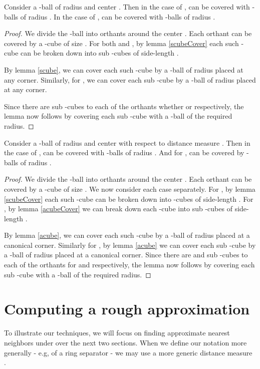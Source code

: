 \documentclass[11pt]{myclass}
\begin{document}
\begin{lemma}\label{sballcover}
Consider a -ball  of radius  and center .
Then in the case of ,  can be covered with  -balls of radius . In the case of ,  can be covered with 
 -balls of radius . 
\end{lemma}
\begin{proof}
We divide the -ball into  orthants around the center . Each orthant can be covered by a -cube of size . 
For both  and , by lemma \ref{scubeCover} each such -cube can be broken down 
into  sub -cubes of side-length .

By lemma \ref{scube}, we can cover each such -cube by a -ball of radius  placed at any corner. Similarly, for , we can cover each
sub -cube by a -ball of radius  placed at any corner. 


Since there are  sub -cubes to each of the  orthants whether  or
 respectively, the lemma now follows by covering each sub -cube with a -ball of the required radius.
\end{proof}



\begin{lemma}\label{aballcover}
Consider a -ball  of radius  and center  with respect to distance measure .
Then in the case of ,  can be covered with  -balls of radius . And for  ,  can be 
covered by  -balls of radius . 
\end{lemma}

\begin{proof}
We divide the -ball into  orthants around the center . Each orthant can be covered by a -cube of size . We now consider each case separately.
For ,  by lemma \ref{scubeCover} each such -cube can be broken down 
into  -cubes of side-length . For , by lemma \ref{acubeCover} we can break down each -cube into 
 sub -cubes of side-length .

By lemma \ref{acube}, we can cover each such -cube by a -ball of radius  placed at a canonical corner. Similarly for , by lemma \ref{acube} we can cover each
sub -cube by a -ball of radius  placed at a canonical corner. 
Since there are  and  sub -cubes to each of the  orthants for  and
 respectively, the lemma now follows by covering each sub -cube with a -ball of the required radius.
\end{proof}
\section{Computing a rough approximation}\label{sec:ringsec}
To illustrate our techniques, we will focus on finding approximate nearest neighbors under  over the next
two sections. When we define our notation more generally - e.g, of a ring separator - we may use a more generic distance measure
.
\end{document}
